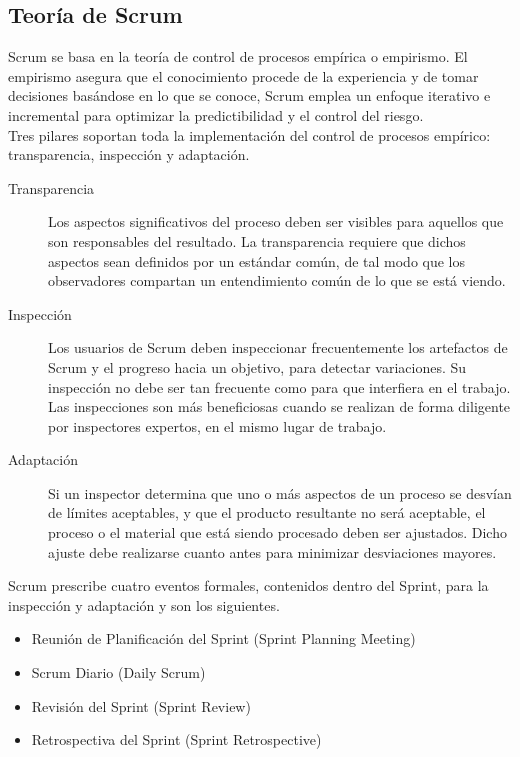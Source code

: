 \subsection{Teoría de Scrum}
Scrum se basa en la teoría de control de procesos empírica o empirismo. El empirismo asegura que el conocimiento procede de la experiencia y de tomar decisiones basándose en lo que se conoce, Scrum emplea un enfoque iterativo e incremental para optimizar la predictibilidad y el control del riesgo. \\

Tres pilares soportan toda la implementación del control de procesos empírico: transparencia, inspección y adaptación. \\
\begin{description}
	\item[Transparencia]  Los aspectos significativos del proceso deben ser visibles para aquellos que son responsables del resultado. La transparencia requiere que dichos aspectos sean definidos por un estándar común, de tal modo que los observadores compartan un entendimiento común de lo que se está viendo.
	\item[Inspección] Los usuarios de Scrum deben inspeccionar frecuentemente los artefactos de Scrum y el progreso hacia un objetivo, para detectar variaciones. Su inspección no debe ser tan frecuente como para que interfiera en el trabajo. Las inspecciones son más beneficiosas cuando se realizan de forma diligente por inspectores expertos, en el mismo lugar de trabajo.
	\item[Adaptación] Si un inspector determina que uno o más aspectos de un proceso se desvían de límites aceptables, y que el producto resultante no será aceptable, el proceso o el material que está siendo procesado deben ser ajustados. Dicho ajuste debe realizarse cuanto antes para minimizar desviaciones mayores.
\end{description}

Scrum prescribe cuatro eventos formales, contenidos dentro del Sprint, para la inspección y adaptación y son los siguientes.
  \begin{itemize}
	\item Reunión de Planificación del Sprint (Sprint Planning Meeting)
	\item Scrum Diario (Daily Scrum)
	\item Revisión del Sprint (Sprint Review)
	\item Retrospectiva del Sprint (Sprint Retrospective)
  \end{itemize}
  
